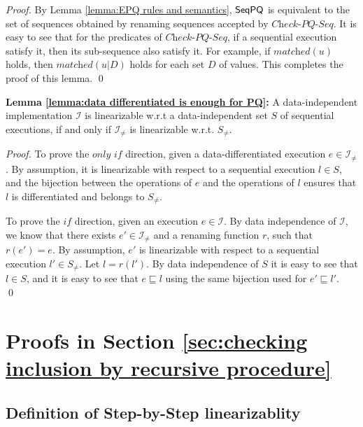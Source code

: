 \begin {proof}

By Lemma \ref{lemma:EPQ rules and semantics}, $\mathsf{SeqPQ}$ is equivalent to the set of sequences obtained by renaming sequences accepted by $\textit{Check-PQ-Seq}$. It is easy to see that for the predicates of $\textit{Check-PQ-Seq}$, if a sequential execution satisfy it, then its sub-sequence also satisfy it. For example, if $\textit{matched}(u)$ holds, then $\textit{matched}(u \vert D)$ holds for each set $D$ of values. This completes the proof of this lemma. \qed
\end {proof}



{\noindent \bf Lemma \ref{lemma:data differentiated is enough for PQ}:} A data-independent implementation $\mathcal{I}$ is linearizable w.r.t a data-independent set $S$ of sequential executions, if and only if $\mathcal{I}_{\neq}$ is linearizable w.r.t. $S_{\neq}$.

\begin {proof}

To prove the $\textit{only if}$ direction, given a data-differentiated execution $e \in \mathcal{I}_{\neq}$. By assumption, it is linearizable with respect to a sequential execution $l \in S$, and the bijection between the operations of $e$ and the operations of $l$ ensures that $l$ is differentiated and belongs to $S_{\neq}$.

To prove the $\textit{if}$ direction, given an execution $e \in \mathcal{I}$. By data independence of $\mathcal{I}$, we know that there exists $e' \in \mathcal{I}_{\neq}$ and a renaming function $r$, such that $r(e') = e$. By assumption, $e'$ is linearizable with respect to a sequential execution $l' \in S_{\neq}$. Let $l=r(l')$. By data independence of $S$ it is easy to see that $l \in S$, and it is easy to see that $e \sqsubseteq l$  using the same bijection used for $e' \sqsubseteq l'$. \qed
\end {proof}





\section{Proofs in Section \ref{sec:checking inclusion by recursive procedure}}
\label{sec:appendix in section checking lnclusion by recursive procedure}




\subsection{Definition of Step-by-Step linearizablity}
\label{sec:appendix definition of step-by-step linearizability}


